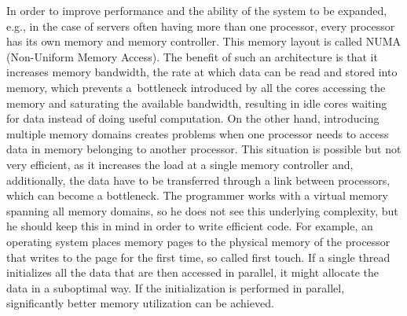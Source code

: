 In order to improve performance and the ability of the system to be expanded, e.g., in the case of servers often having more than one processor, every processor has its own memory and memory controller. This memory layout is called NUMA (Non-Uniform Memory Access). The benefit of such an architecture is that it increases memory bandwidth, the rate at which data can be read and stored into memory, which prevents a~bottleneck introduced by all the cores accessing the memory and saturating the available bandwidth, resulting in idle cores waiting for data instead of doing useful computation. On the other hand, introducing multiple memory domains creates problems when one processor needs to access data in memory belonging to another processor. This situation is possible but not very efficient, as it increases the load at a single memory controller and, additionally, the data have to be transferred through a link between processors, which can become a bottleneck. The programmer works with a virtual memory spanning all memory domains, so he does not see this underlying complexity, but he should keep this in mind in order to write efficient code. For example, an operating system places memory pages to the physical memory of the processor that writes to the page for the first time, so called first touch. If a single thread initializes all the data that are then accessed in parallel, it might allocate the data in a suboptimal way. If the initialization is performed in parallel, significantly better memory utilization can be achieved.

